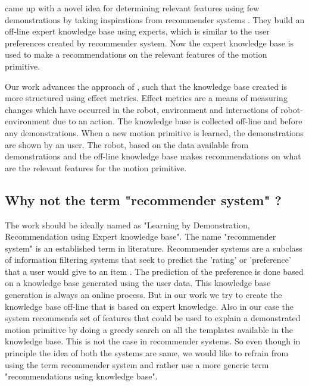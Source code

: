 \cite{abdo_inferring_2014} came up with a novel idea for determining
relevant features using few demonstrations by taking inspirations from
recommender systems . They build an off-line expert knowledge base using
experts, which is similar to the user preferences created by recommender
system. Now the expert knowledge base is used to make a recommendations on the
relevant features of the motion primitive.


Our work advances the approach of \cite{abdo_inferring_2014}, such that the
knowledge base created is more structured using effect metrics. Effect metrics
are a means of measuring changes which have occurred in the robot, environment
and interactions of robot-environment due to an action.  The knowledge base is
collected off-line and before any demonstrations. When a new motion primitive
is learned, the demonstrations are shown by an user. The robot, based on the
data available from demonstrations and the off-line knowledge base makes
recommendations on what are the relevant features for the motion primitive.


\subsection{Why not the term "recommender system" ?}
The work should be ideally named as "Learning by Demonstration, Recommendation
using Expert knowledge base". The name "recommender system" is an established
term in literature. Recommender systems are a subclass of information filtering
systems that seek to predict the 'rating' or 'preference' that a user would
give to an item \cite{bobadilla_recommender_2013}. The prediction of the
preference is done based on a knowledge base generated using the user data.
This knowledge base generation is always an online process. But in our work we
try to create the knowledge base off-line that is based on expert knowledge.
Also in our case the system recommends set of features that could be used to
explain a demonstrated motion primitive by doing a greedy search on all the
templates available in the knowledge base. This is not the case in recommender
systems. So even though in principle the idea of both the systems are same, we
would like to refrain from using the term recommender system and rather use a
more generic term "recommendations using knowledge base".
